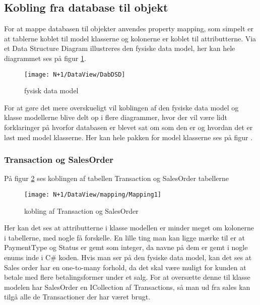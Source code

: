 \subsection{Kobling fra database til objekt}
For at mappe databasen til objekter anvendes property mapping, som simpelt er at tablerne koblet til model klasserne og kolonerne er koblet til attributterne. Via et Data Structure Diagram illustreres den fysiske data model, her kan hele diagrammet ses på figur \ref{fig:DSD}.

\begin{figure}[H]
    \centering
    \texttt{[image: N+1/DataView/DabDSD]}
    \caption{fysisk data model}
    \label{fig:DSD}
\end{figure}

For at gøre det mere overskueligt vil koblingen af den fysiske data model og klasse modellerne blive delt op i flere diagrammer, hvor der vil være lidt forklaringer på hvorfor databasen er blevet sat om som den er og hvordan det er løst med model klasserne. Her kan hele pakken for model klasserne ses på figur .

\subsubsection{Transaction og SalesOrder}
På figur \ref{fig:Mapping_TS} ses koblingen af tabellen Transaction og SalesOrder tabellerne

\begin{figure}[H]
    \centering
    \texttt{[image: N+1/DataView/mapping/Mapping1]}
    \caption{kobling af Transaction og SalesOrder}
    \label{fig:Mapping_TS}
\end{figure}

Her kan det ses at attributterne i klasse modellen er minder meget om kolonerne i tabellerne, med nogle få forskelle. En lille ting man kan ligge mærke til er at PaymentType og Status er gemt som integer, da navne på dem er gemt i nogle enums inde i C\# koden. 
\newline\newline
Hvis man ser på den fysiske data model, kan det ses at Sales order har en one-to-many forhold, da det skal være muligt for kunden at betale med flere betalingsformer under et salg. For at oversætte denne til klasse modelen har SalesOrder en ICollection af Transactions, så man ud fra sales kan tilgå alle de Transactioner der har været brugt. 

